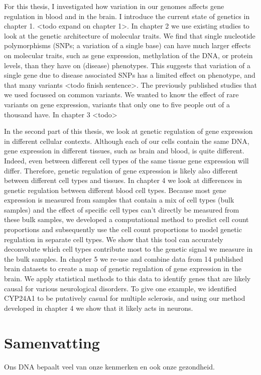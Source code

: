 \begin{appendices}
For this thesis, I investigated how variation in our genomes affects gene regulation in blood and in the brain. I introduce the current state of genetics in chapter 1. <todo expand on chapter 1>. In chapter 2 we use existing studies to look at the genetic architecture of molecular traits. We find that single nucleotide polymorphisms (SNPs; a variation of a single base) can have much larger effects on molecular traits, such as gene expression, methylation of the DNA, or protein levels, than they have on (disease) phenotypes. This suggests that variation of a single gene due to disease associated SNPs has a limited effect on phenotype, and that many variants <todo finish sentence>. 
The previously published studies that we used focussed on common variants. We wanted to know the effect of rare variants on gene expression, variants that only one to five people out of a thousand have. In chapter 3 <todo> 

In the second part of this thesis, we look at genetic regulation of gene expression in different cellular contexts. Although each of our cells contain the same DNA, gene expression in different tissues, such as brain and blood, is quite different. Indeed, even between different cell types of the same tissue gene expression will differ. Therefore, genetic regulation of gene expression is likely also different between different cell types and tissues. In chapter 4 we look at differences in genetic regulation between different blood cell types. Because most gene expression is measured from samples that contain a mix of cell types (bulk samples) and the effect of specific cell types can’t directly be measured from these bulk samples, we developed a computational method to predict cell count proportions and subsequently use the cell count proportions to model genetic regulation in separate cell types. We show that this tool can accurately deconvolute which cell types contribute most to the genetic signal we measure in the bulk samples. In chapter 5 we re-use and combine data from 14 published brain datasets to create a map of genetic regulation of gene expression in the brain. We apply statistical methods to this data to identify genes that are likely causal for various neurological disorders. To give one example, we identified CYP24A1 to be putatively casual for multiple sclerosis, and using our method developed in chapter 4 we show that it likely acts in neurons. 



\chapter{Samenvatting}
Ons DNA bepaalt veel van onze kenmerken en ook onze gezondheid. 

\end{appendices}
